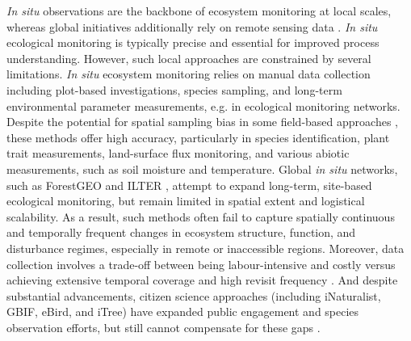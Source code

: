 \documentclass[pdflatex,sn-mathphys-num]{sn-jnl}%
\theoremstyle{thmstyleone}%
\theoremstyle{thmstyletwo}%
\theoremstyle{thmstylethree}%
\begin{document}
\textit{In situ} observations are the backbone of ecosystem monitoring at local scales, whereas global initiatives additionally rely on remote sensing data \cite{balsamo2018satellite}. \textit{In situ} ecological monitoring is typically precise and essential for improved process understanding. However, such local approaches are constrained by several limitations. \textit{In situ} ecosystem monitoring relies on manual data collection including plot-based investigations, species sampling, and long-term environmental parameter measurements, e.g. in ecological monitoring networks. Despite the potential for spatial sampling bias in some field-based approaches \cite{verheyen2012driving}, these methods offer high accuracy, particularly in species identification, plant trait measurements, land-surface flux monitoring, and various abiotic measurements, such as soil moisture and temperature. Global \textit{in situ} networks, such as ForestGEO \cite{anderson2015ctfs} and ILTER \cite{mirtl2018genesis}, attempt to expand long-term, site-based ecological monitoring, but remain limited in spatial extent and logistical scalability\cite{magurran2010long}. As a result, such methods often fail to capture spatially continuous and temporally frequent changes in ecosystem structure, function, and disturbance regimes, especially in remote or inaccessible regions. Moreover, data collection involves a trade-off between being labour-intensive and costly versus achieving extensive temporal coverage and high revisit frequency \cite{magurran2010long}. And despite substantial advancements, citizen science approaches (including iNaturalist, GBIF, eBird, and iTree) have expanded public engagement and species observation efforts, but still cannot compensate for these gaps \cite{bonney2021expanding,schiller2021deep}.
\end{document}

